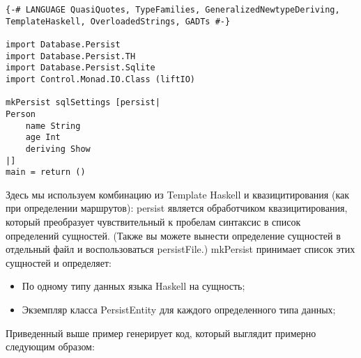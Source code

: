 \begin{lstlisting}
{-# LANGUAGE QuasiQuotes, TypeFamilies, GeneralizedNewtypeDeriving, TemplateHaskell, OverloadedStrings, GADTs #-}

import Database.Persist
import Database.Persist.TH
import Database.Persist.Sqlite
import Control.Monad.IO.Class (liftIO)

mkPersist sqlSettings [persist|
Person
    name String
    age Int
    deriving Show
|]
main = return ()
\end{lstlisting}

Здесь мы используем комбинацию из Template Haskell и квазицитирования (как при определении маршрутов): persist является обработчиком квазицитирования, который преобразует чувствительный к пробелам синтаксис в список определений сущностей. (Также вы можете вынести определение сущностей в отдельный файл и воспользоваться persistFile.) mkPersist принимает список этих сущностей и определяет:

\begin{itemize}
  \item По одному типу данных языка Haskell на сущность;
  \item Экземпляр класса PersistEntity для каждого определенного типа данных;
\end{itemize}

Приведенный выше пример генерирует код, который выглядит примерно следующим образом:

